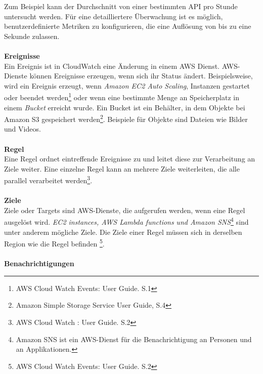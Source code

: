 Zum Beispiel kann der Durchschnitt von einer bestimmten API pro Stunde untersucht werden. Für eine detailliertere Überwachung ist es möglich, benutzerdefinierte Metriken zu konfigurieren, die eine Auflösung von bis zu eine Sekunde zulassen. %
\\\\
\textbf{Ereignisse}\\
Ein Ereignis ist in CloudWatch eine Änderung in einem AWS Dienst. AWS-Dienste können Ereignisse erzeugen, wenn sich ihr Status ändert. %
Beispielsweise, wird ein Ereignis erzeugt, wenn \textit{Amazon EC2 Auto Scaling}, Instanzen gestartet oder beendet werden\footnote{AWS Cloud Watch Events: User Guide. S.1\cite{AMZ13}} oder wenn eine bestimmte Menge an Speicherplatz in einem \textit{Bucket} erreicht wurde. Ein Bucket ist ein Behälter, in dem Objekte bei Amazon S3 gespeichert werden\footnote{Amazon Simple Storage Service User Guide, S.4\cite{AMZ18}}. Beispiele für Objekte sind Dateien wie Bilder und Videos. 
\\\\
\textbf{Regel} \\
Eine Regel ordnet eintreffende Ereignisse zu und leitet diese zur Verarbeitung an Ziele weiter.
Eine einzelne Regel kann an mehrere Ziele weiterleiten, die alle parallel verarbeitet werden\footnote{AWS Cloud Watch : User Guide. S.2\cite{AMZ13}}.
\\\\
\textbf{Ziele} \\
Ziele oder Targets sind AWS-Dienste, die aufgerufen werden, wenn eine Regel ausgelöst wird.
\textit{EC2 instances, AWS Lambda functions} \textit{und Amazon SNS}\footnote{Amazon SNS ist ein AWS-Dienst für die Benachrichtigung an Personen und an Applikationen.\cite{AMZ30}} sind unter anderem mögliche Ziele.
Die Ziele einer Regel müssen sich in derselben Region wie die Regel befinden
\footnote{AWS Cloud Watch Events: User Guide. S.2\cite{AMZ13}}.
\\\\
\textbf{Benachrichtigungen}\\
